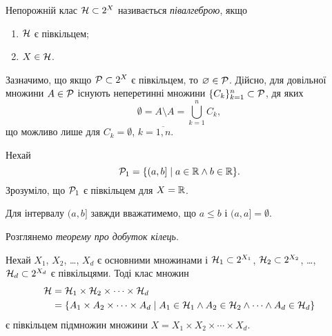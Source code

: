 \begin{definition}
	\label{def-1-3-a}
	Непорожній клас $\mathcal H\subset 2^X$ називається \emph{півалгеброю}, якщо
	\begin{enumerate}[label={\upshape (\roman*)}]
		\item \label{def-1-3-a-i}
		$\mathcal H $ є півкільцем;
		\item \label{def-1-3-a-ii}
		$X\in\mathcal H $.
	\end{enumerate}
\end{definition}

Зазначимо, що якщо $\mathcal P\subset 2^X$ є півкільцем, то $\varnothing\in\mathcal P$. \label{semi-ring-emptyset} Дійсно, для довільної множини $A\in\mathcal P$ існують неперетинні множини  $\{C_k\}_{k=1}^n\subset\mathcal P$, дя яких 
$$
\emptyset=A\setminus A= \bigcup_{k=1}^n C_k,
$$
що можливо лише для $C_k=\emptyset$, $k=\overline{1,n}$.

\begin{example}
	\label{ex-1-4}
	Нехай
	$$
	\mathcal P_1=\{(a,b]\mid a\in{\mathbb R} \land b\in{\mathbb R}\}.
	$$
	Зрозуміло, що $\mathcal P_1$ є півкільцем для $X={\mathbb R}$.
\end{example}

\begin{remark}
	Для інтервалу $(a,b]$ завжди вважатимемо, що $a\leq b$ і $(a,a]=\emptyset$.
\end{remark}

Розглянемо \emph{теорему про добуток кілець}.

\begin{theorem}
	\label{th-1-1}
	Нехай $X_1$, $X_2$, \ldots, $X_d$ є основними множинами і $\mathcal H_1\subset 2^{X_1}$, $\mathcal H_2\subset 2^{X_2}$, \ldots,  $\mathcal H_d\subset 2^{X_d}$ є півкільцями. Тоді клас множин
	\begin{align*}
	\mathcal H&=\mathcal H_1\times\mathcal H_2\times\cdots\times\mathcal H_d
	\\
	&=\{A_1\times A_2\times\cdots\times A_d\mid A_1\in\mathcal H_1 \land A_2\in\mathcal H_2 \land \cdots \land A_d\in\mathcal H_d\}
	\end{align*}
	є півкільцем підмножин множини $X=X_1\times X_2 \times\cdots\times X_d$.
\end{theorem}

